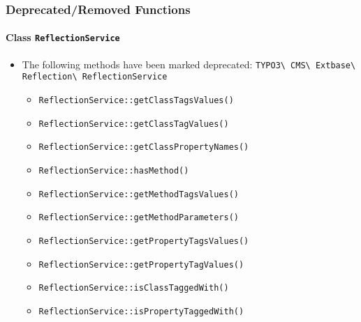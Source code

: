 
\begin{frame}[fragile]
	\frametitle{Deprecated/Removed Functions}
	\framesubtitle{Class \texttt{ReflectionService}}

	\begin{itemize}
		\item The following methods have been marked deprecated:\newline
			\smaller\texttt{TYPO3\textbackslash
				CMS\textbackslash
				Extbase\textbackslash
				Reflection\textbackslash
				ReflectionService}\normalsize

				\begin{itemize}\smaller
					\item \texttt{ReflectionService::getClassTagsValues()}
					\item \texttt{ReflectionService::getClassTagValues()}
					\item \texttt{ReflectionService::getClassPropertyNames()}
					\item \texttt{ReflectionService::hasMethod()}
					\item \texttt{ReflectionService::getMethodTagsValues()}
					\item \texttt{ReflectionService::getMethodParameters()}
					\item \texttt{ReflectionService::getPropertyTagsValues()}
					\item \texttt{ReflectionService::getPropertyTagValues()}
					\item \texttt{ReflectionService::isClassTaggedWith()}
					\item \texttt{ReflectionService::isPropertyTaggedWith()}
				\end{itemize}

	\end{itemize}

\end{frame}


